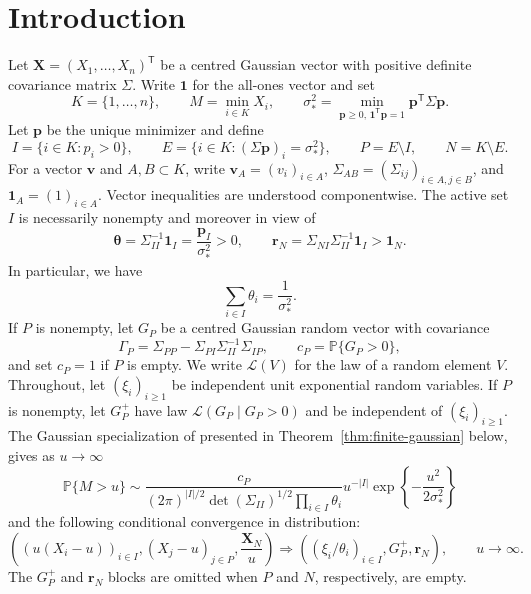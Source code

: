 \documentclass[11pt]{amsart}
\theoremstyle{definition}
\theoremstyle{remark}
\newcommand{\Pp}{\mathbb P}
\begin{document}
\section{Introduction}
Let
$\boldsymbol X=(X_1,\ldots,X_n)^{\mathsf T}$ be a centred Gaussian vector
with positive definite covariance matrix $\Sigma$.  Write $\boldsymbol1$
for the all-ones vector and set
\[
 K=\{1,\ldots,n\},\qquad
 M=\min_{i\in K}X_i,
 \qquad
 \sigma_*^2=\min_{\boldsymbol p\geq0,
             \,\boldsymbol1^{\mathsf T}\boldsymbol p=1}
             \boldsymbol p^{\mathsf T}\Sigma\boldsymbol p.
\]
Let $\boldsymbol p$ be the unique minimizer and define
\[
 I=\{i\in K:p_i>0\},\qquad
 E=\{i\in K:(\Sigma\boldsymbol p)_i=\sigma_*^2\},\qquad
 P=E\setminus I,\qquad N=K\setminus E.
\]
For a vector $\boldsymbol v$ and $A,B\subset K$, write
$\boldsymbol v_A=(v_i)_{i\in A}$,
$\Sigma_{AB}=(\Sigma_{ij})_{i\in A,j\in B}$, and
$\boldsymbol1_A=(1)_{i\in A}$.  Vector inequalities are understood
componentwise.
The active set $I$ is necessarily nonempty and moreover in view of  
\cite[Lemma~4.1]{debicki2020extremes}
\[ 
 \boldsymbol\theta=\Sigma_{II}^{-1}\boldsymbol1_I
 =\frac{\boldsymbol p_I}{\sigma_*^2}>0,
 \qquad
 \boldsymbol r_N=\Sigma_{NI}\Sigma_{II}^{-1}\boldsymbol1_I
 >\boldsymbol1_N.
\]
In particular, we have 
\[
 \sum_{i\in I}\theta_i=\frac1{\sigma_*^2}.
\]
If $P$ is nonempty, let $G_P$ be a centred
Gaussian random vector with covariance
\[
 \Gamma_P=\Sigma_{PP}-\Sigma_{PI}\Sigma_{II}^{-1}\Sigma_{IP},
 \qquad c_P=\Pp\{G_P>0\},
\]
and set $c_P=1$ if $P$ is empty.  We write $\mathcal L(V)$ for the law
of a random element $V$.  Throughout, let $(\xi_i)_{i\geq1}$ be
independent unit exponential random variables.  If $P$ is nonempty, let
$G_P^+$ have law $\mathcal L(G_P\mid G_P>0)$ and be independent of
$(\xi_i)_{i\geq1}$.  \\
The Gaussian specialization of
\cite[Example~6.1 and Theorem~5.1]{Hashorva2007} presented  in
Theorem~\ref{thm:finite-gaussian} below, gives as $u\to\infty$
\begin{equation}
 \Pp\{M>u\}\sim
 \frac{c_P}{(2\pi)^{|I|/2}\det(\Sigma_{II})^{1/2}
              \prod_{i\in I}\theta_i}
 u^{-|I|}\exp\left\{-\frac{u^2}{2\sigma_*^2}\right\}
 \label{eq:intro-finite-tail}
\end{equation}
and the following conditional convergence in distribution:
\begin{equation}
 \left(
   (u(X_i-u))_{i\in I},
   (X_j-u)_{j\in P},
   \frac{\boldsymbol X_N}{u}
 \right)
 \Longrightarrow
 \left(
   (\xi_i/\theta_i)_{i\in I},
   G_P^+,
   \boldsymbol r_N
 \right), \qquad u\to \infty.
 \label{eq:intro-finite-excess}
\end{equation}
The $G_P^+$ and $\boldsymbol r_N$ blocks are omitted
when $P$ and $N$, respectively, are empty.
\end{document}
